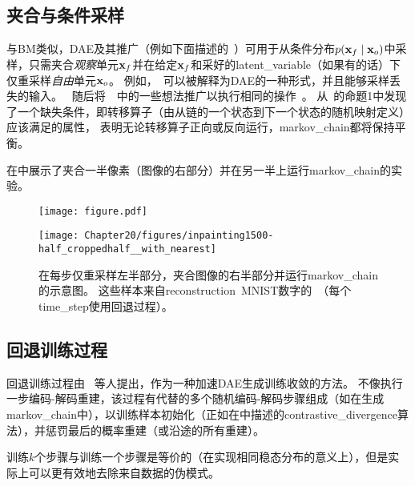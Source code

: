 
\subsection{夹合与条件采样}
\label{sec:clamping_and_conditional_sampling}

与\gls{BM}类似，\gls{DAE}及其推广（例如下面描述的~）可用于从条件分布$p(\mathbf{x}_f  \mid  \mathbf{x}_o)$中采样，只需夹合\emph{观察}单元$\mathbf{x}_f$并在给定$\mathbf{x}_f$和采好的\gls{latent_variable}（如果有的话）下仅重采样\emph{自由}单元$\mathbf{x}_o$。
例如，~可以被解释为\gls{DAE}的一种形式，并且能够采样丢失的输入。
~随后将~~中的一些想法推广以执行相同的操作~\citep{Bengio-et-al-ICML-2014}。
\citet{Alain-et-al-arxiv2015} 从~\citet{Bengio-et-al-ICML-2014}的命题1中发现了一个缺失条件，即转移算子（由从链的一个状态到下一个状态的随机映射定义）应该满足的属性， 表明无论转移算子正向或反向运行，\gls{markov_chain}都将保持平衡。

在中展示了夹合一半像素（图像的右部分）并在另一半上运行\gls{markov_chain}的实验。

\begin{figure}[!htb]
\ifOpenSource
\centerline{\texttt{[image: figure.pdf]}}
\else
\centerline{\texttt{[image: Chapter20/figures/inpainting1500-half\_croppedhalf\_\_with\_nearest]}}
\fi
\caption{在每步仅重采样左半部分，夹合图像的右半部分并运行\gls{markov_chain}的示意图。
这些样本来自\gls{reconstruction}~MNIST数字的~（每个\gls{time_step}使用回退过程）。
}
\label{fig:chap20_inpainting1500-half_croppedhalf__with_nearest}
\end{figure}

\subsection{回退训练过程}
\label{sec:walk_back_training_procedure}
回退训练过程由~\citet{Bengio-et-al-NIPS2013-small} 等人提出，作为一种加速\gls{DAE}生成训练收敛的方法。
不像执行一步编码-解码重建，该过程有代替的多个随机编码-解码步骤组成（如在生成\gls{markov_chain}中），以训练样本初始化（正如在中描述的\gls{contrastive_divergence}算法），并惩罚最后的概率重建（或沿途的所有重建）。

训练$k$个步骤与训练一个步骤是等价的（在实现相同稳态分布的意义上），但是实际上可以更有效地去除来自数据的伪模式。

